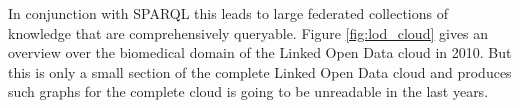 In conjunction with SPARQL this leads to large federated collections of knowledge that are comprehensively queryable.
Figure \ref{fig:lod_cloud} gives an overview over the biomedical domain of the Linked Open Data cloud in 2010.
But this is only a small section of the complete Linked Open Data cloud and produces such graphs for the complete cloud is going to be unreadable in the last years.

